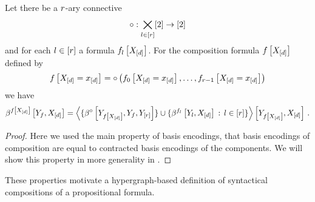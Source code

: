 \begin{lemma}
    \label{lem:basisEncodingConnectiveComposition}
    Let there be a $r$-ary connective
    \begin{align*}
        \circ: \bigtimes_{l\in[r]}[2] \rightarrow [2]
    \end{align*}
    and for each $l\in[r]$ a formula $f_{l}\left[X_{[d]}\right]$.
    For the composition formula $f\left[X_{[d]}\right]$ defined by
    \begin{align*}
        f\left[X_{[d]}=x_{[d]}\right] =    \circ\left(f_{0}\left[X_{[d]}=x_{[d]}\right],\ldots,f_{r-1}\left[X_{[d]}=x_{[d]}\right]\right)
    \end{align*}
    we have
    \begin{align*}
        \beta^{f\left[X_{[d]}\right]}\left[Y_{f},X_{[d]}\right]
        = \left\langle 
            \{\beta^{\circ}\left[Y_{f\left[X_{[d]}\right]},Y_{f},Y_{[r]}\right]\}
            \cup \{\beta^{f_{l}}\left[Y_{l},X_{[d]}\right] \,:\, l\in[r] \}
        \right\rangle \left[ Y_{f\left[X_{[d]}\right]},X_{[d]} \right] \, .
    \end{align*}
\end{lemma}
\begin{proof}
    Here we used the main property of basis encodings, that basis encodings of composition are equal to contracted basis encodings of the components.
    We will show this property in more generality in .
\end{proof}


These properties motivate a hypergraph-based definition of syntactical compositions of a propositional formula. %

